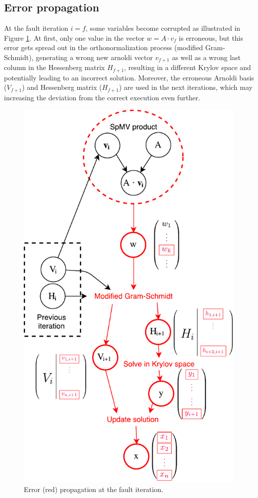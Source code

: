 \documentclass[twoside]{article}
\newcounter{fig}\setcounter{fig}{0}
\begin{document}
  \subsection{Error propagation}\label{sec:propagation}
  At the fault iteration $i=f$, some variables become corrupted as illustrated in Figure \ref{fig:error_propagation}. At first, only one value in the vector $w = A \cdot v_f$ is erroneous, but this error gets spread out in the orthonormalization process (modified Gram-Schmidt), generating a wrong new arnoldi vector $v_{f+1}$ as well as a wrong last column in the Hessenberg matrix $H_{f+1}$, resulting in a different Krylov space and potentially leading to an incorrect solution. Moreover, the erroneous Arnoldi basis ($V_{f+1}$) and Hessenberg matrix ($H_{f+1}$) are used in the next iterations, which may increasing the deviation from the correct execution even further. 
  \begin{figure}[H]
    \centering
    \includegraphics[scale=0.4]{figures/error_propagation.pdf}
    \caption{Error (red) propagation at the fault iteration.}\label{fig:error_propagation}
  \end{figure}
\end{document}
